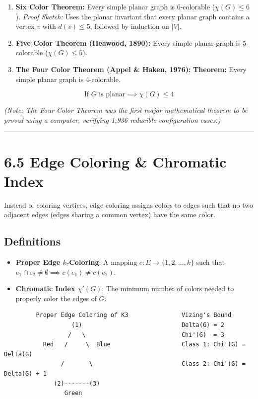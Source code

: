 \documentclass[
]{book}
\providecommand{\tightlist}{%
  \setlength{\itemsep}{0pt}\setlength{\parskip}{0pt}}
\theoremstyle{definition}
\theoremstyle{definition}
\theoremstyle{definition}
\theoremstyle{definition}
\theoremstyle{remark}
\begin{document}
\begin{enumerate}
\def\labelenumi{\arabic{enumi}.}
\tightlist
\item
  \textbf{Six Color Theorem:}
  Every simple planar graph is 6-colorable (\(\chi(G) \le 6\)).
  \emph{Proof Sketch:} Uses the planar invariant that every planar graph contains a vertex \(v\) with \(d(v) \le 5\), followed by induction on \(\vert{}V\vert{}\).
\item
  \textbf{Five Color Theorem (Heawood, 1890):}
  Every simple planar graph is 5-colorable (\(\chi(G) \le 5\)).
\item
  \textbf{The Four Color Theorem (Appel \& Haken, 1976):}
  \textbf{Theorem:} Every simple planar graph is 4-colorable.
\end{enumerate}

\[\text{If } G \text{ is planar} \implies \chi(G) \le 4\]

\emph{(Note: The Four Color Theorem was the first major mathematical theorem to be proved using a computer, verifying 1,936 reducible configuration cases.)}

\begin{center}\rule{0.5\linewidth}{0.5pt}\end{center}

\section{6.5 Edge Coloring \& Chromatic Index}\label{edge-coloring-chromatic-index}

Instead of coloring vertices, edge coloring assigns colors to edges such that no two adjacent edges (edges sharing a common vertex) have the same color.

\subsection{Definitions}\label{definitions-4}

\begin{itemize}
\tightlist
\item
  \textbf{Proper Edge \(k\)-Coloring}: A mapping \(c: E \to \{1, 2, \dots, k\}\) such that \(e_1 \cap e_2 \neq \emptyset \implies c(e_1) \neq c(e_2)\).
\item
  \textbf{Chromatic Index \(\chi'(G)\)}: The minimum number of colors needed to properly color the edges of \(G\).
\end{itemize}

\begin{verbatim}
         Proper Edge Coloring of K3               Vizing's Bound
                   (1)                            Delta(G) = 2
                  /   \                           Chi'(G)  = 3
           Red   /     \  Blue                    Class 1: Chi'(G) = Delta(G)
                /       \                         Class 2: Chi'(G) = Delta(G) + 1
              (2)-------(3)
                 Green
\end{verbatim}
\end{document}
